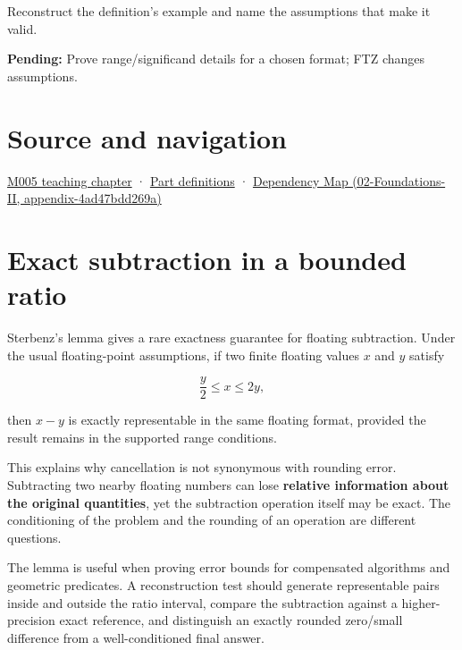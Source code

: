 Reconstruct the definition's example and name the assumptions that make it valid.

\textbf{Pending:} Prove range/significand details for a chosen format; FTZ changes assumptions.

\section{Source and navigation}\label{appendix-399b7ad53f39-source-and-navigation}

\href{Continuous\%20Notes/Computing\%20Foundations\%20-\%20From\%20Bits\%20to\%20C++\%20and\%20Systems\%20APIs\#When\%20arithmetic\%20meets\%20uncertainty}{M005 teaching chapter} · \hyperref[appendix-fd090d982a15-m005---parts-77-88]{Part definitions} · \href{../02-Foundations-II/main.pdf\#nameddest=appendix-4ad47bdd269a}{Dependency Map (02-Foundations-II, appendix-4ad47bdd269a)}

\section{Exact subtraction in a bounded ratio}\label{appendix-399b7ad53f39-exact-subtraction-in-a-bounded-ratio}

Sterbenz's lemma gives a rare exactness guarantee for floating subtraction. Under the usual floating-point assumptions, if two finite floating values \(x\) and \(y\) satisfy

\[
\frac{y}{2} \le x \le 2y,
\]

then \(x-y\) is exactly representable in the same floating format, provided the result remains in the supported range conditions.

This explains why cancellation is not synonymous with rounding error. Subtracting two nearby floating numbers can lose \textbf{relative information about the original quantities}, yet the subtraction operation itself may be exact. The conditioning of the problem and the rounding of an operation are different questions.

The lemma is useful when proving error bounds for compensated algorithms and geometric predicates. A reconstruction test should generate representable pairs inside and outside the ratio interval, compare the subtraction against a higher-precision exact reference, and distinguish an exactly rounded zero/small difference from a well-conditioned final answer.
